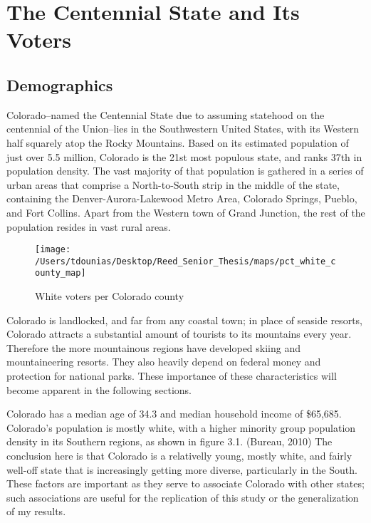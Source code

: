 \documentclass[12pt,twoside]{reedthesis}
\begin{document}
  \section{The Centennial State and Its
  Voters}\label{the-centennial-state-and-its-voters}
  
  \subsection{Demographics}\label{demographics}
  
  Colorado--named the Centennial State due to assuming statehood on the
  centennial of the Union--lies in the Southwestern United States, with
  its Western half squarely atop the Rocky Mountains. Based on its
  estimated population of just over 5.5 million, Colorado is the 21st most
  populous state, and ranks 37th in population density. The vast majority
  of that population is gathered in a series of urban areas that comprise
  a North-to-South strip in the middle of the state, containing the
  Denver-Aurora-Lakewood Metro Area, Colorado Springs, Pueblo, and Fort
  Collins. Apart from the Western town of Grand Junction, the rest of the
  population resides in vast rural areas.
  
  \begin{figure}
  
  {\centering \texttt{[image: /Users/tdounias/Desktop/Reed\_Senior\_Thesis/maps/pct\_white\_county\_map]} 
  
  }
  
  \caption[White voters per Colorado county]{White voters per Colorado county}\label{fig:white pct map}
  \end{figure}
  
  Colorado is landlocked, and far from any coastal town; in place of
  seaside resorts, Colorado attracts a substantial amount of tourists to
  its mountains every year. Therefore the more mountainous regions have
  developed skiing and mountaineering resorts. They also heavily depend on
  federal money and protection for national parks. These importance of
  these characteristics will become apparent in the following sections.
  
  Colorado has a median age of 34.3 and median household income of
  \$65,685. Colorado's population is mostly white, with a higher minority
  group population density in its Southern regions, as shown in figure
  3.1. (Bureau, 2010) The conclusion here is that Colorado is a
  relativelly young, mostly white, and fairly well-off state that is
  increasingly getting more diverse, particularly in the South. These
  factors are important as they serve to associate Colorado with other
  states; such associations are useful for the replication of this study
  or the generalization of my results.
  
\end{document}
